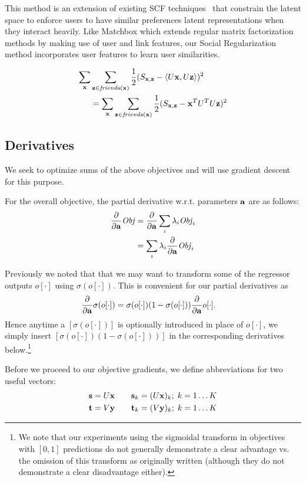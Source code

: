 This method is an extension of existing SCF techniques~\cite{lla,socinf} that constrain the latent space to enforce users  to have similar preferences latent representations when they interact heavily. Like Matchbox which extends regular matrix factorization methods by making use of user and link features, our Social Regularization method incorporates user features to learn user similarities.

\begin{align}
\sum_{\mathbf{x}} & \sum_{\mathbf{z} \in \mathit{friends}(\mathbf{x})} \frac{1}{2} (S_{\mathbf{x},\mathbf{z}} - \langle U\mathbf{x}, U\mathbf{z} \rangle)^2 \nonumber \\
& = \sum_{\mathbf{x}} \sum_{\mathbf{z} \in \mathit{friends}(\mathbf{x})} \frac{1}{2} (S_{\mathbf{x},\mathbf{z}} - \mathbf{x}^T U^T U \mathbf{z})^2
\end{align}

\subsection{Derivatives}

We seek to optimize sums of the above objectives and will use
gradient descent for this purpose.  

For the overall objective, the partial derivative 
w.r.t. parameters $\mathbf{a}$ are as follows:
\begin{align*}
\frac{\partial}{\partial \mathbf{a}} \mathit{Obj} & = \frac{\partial}{\partial \mathbf{a}} \sum_i \lambda_i \mathit{Obj}_i\\
& = \sum_i \lambda_i \frac{\partial}{\partial \mathbf{a}} \mathit{Obj}_i \label{eq:sum_der}
\end{align*}

Previously we noted that that we may want to transform
some of the regressor outputs $o[\cdot]$ using $\sigma(o[\cdot])$.  
This is convenient for our partial derivatives as
\begin{align}
 \frac{\partial}{\partial \mathbf{a}}\sigma(o[\cdot]) & = \sigma(o[\cdot]) (1 - \sigma(o[\cdot])) \frac{\partial}{\partial \mathbf{a}} o[\cdot] .
\end{align}
Hence anytime a $[\sigma(o[\cdot])]$ is optionally 
introduced in place of $o[\cdot]$, we simply
insert $[\sigma(o[\cdot]) (1 - \sigma(o[\cdot]))]$ in the corresponding derivatives 
below.\footnote{We note that our experiments using the sigmoidal transform in
objectives with $[0,1]$ predictions do not generally demonstrate a
clear advantage vs. the omission of this transform as originally
written (although they do not demonstrate a clear disadvantage
either).}

Before we proceed to our objective gradients, we define abbreviations
for two useful vectors:
\begin{align*}
\mathbf{s} & = U \mathbf{x} \qquad \mathbf{s}_{k} = (U \mathbf{x})_{k}; \; k=1\ldots K\\
\mathbf{t} & = V \mathbf{y} \qquad \mathbf{t}_{k} = (V \mathbf{y})_{k}; \; k=1\ldots K
\end{align*}


